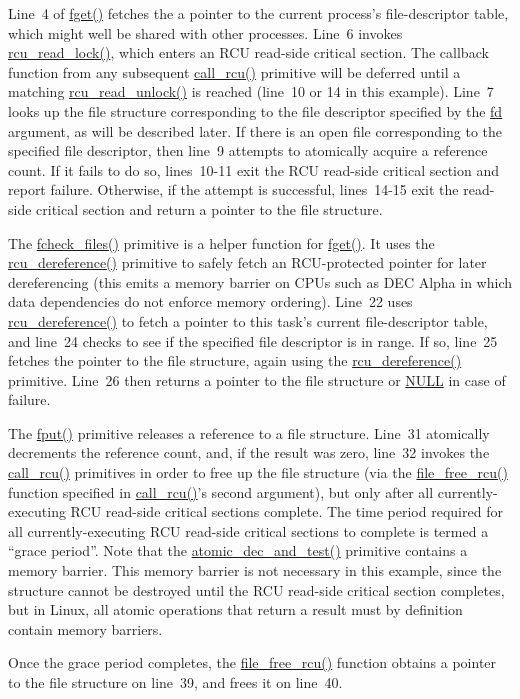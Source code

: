 Line~4 of \url{fget()} fetches the a pointer to the current
process's file-descriptor table, which might well be shared
with other processes.
Line~6 invokes \url{rcu_read_lock()}, which
enters an RCU read-side critical section.
The callback function from any subsequent \url{call_rcu()} primitive
will be deferred until a matching \url{rcu_read_unlock()} is reached
(line~10 or 14 in this example).
Line~7 looks up the file structure corresponding to the file
descriptor specified by the \url{fd} argument, as will be
described later.
If there is an open file corresponding to the specified file descriptor,
then line~9 attempts to atomically acquire a reference count.
If it fails to do so, lines~10-11 exit the RCU read-side critical
section and report failure.
Otherwise, if the attempt is successful, lines~14-15 exit the read-side
critical section and return a pointer to the file structure.

The \url{fcheck_files()} primitive is a helper function for
\url{fget()}.
It uses the \url{rcu_dereference()} primitive to safely fetch an
RCU-protected pointer for later dereferencing (this emits a
memory barrier on CPUs such as DEC Alpha in which data dependencies
do not enforce memory ordering).
Line~22 uses \url{rcu_dereference()} to fetch a pointer to this
task's current file-descriptor table,
and line~24 checks to see if the specified file descriptor is in range.
If so, line~25 fetches the pointer to the file structure, again using
the \url{rcu_dereference()} primitive.
Line~26 then returns a pointer to the file structure or \url{NULL}
in case of failure.

The \url{fput()} primitive releases a reference to a file structure.
Line~31 atomically decrements the reference count, and, if the result
was zero, line~32 invokes the \url{call_rcu()} primitives in order to
free up the file structure (via the \url{file_free_rcu()} function
specified in \url{call_rcu()}'s second argument),
but only after all currently-executing
RCU read-side critical sections complete.
The time period required for all currently-executing RCU read-side
critical sections to complete is termed a ``grace period''.
Note that the \url{atomic_dec_and_test()} primitive contains
a memory barrier.
This memory barrier is not necessary in this example, since the structure
cannot be destroyed until the RCU read-side critical section completes,
but in Linux, all atomic operations that return a result must
by definition contain memory barriers.

Once the grace period completes, the \url{file_free_rcu()} function
obtains a pointer to the file structure on line~39, and frees it
on line~40.

